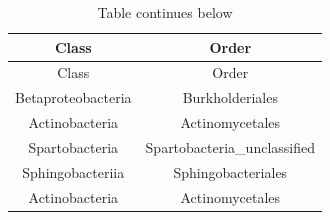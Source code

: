 \documentclass[]{article}
\begin{document}
\begin{longtable}[]{@{}cc@{}}
\caption{Table continues below}\tabularnewline
\toprule
\begin{minipage}[b]{0.39\columnwidth}\centering\strut
Class\strut
\end{minipage} & \begin{minipage}[b]{0.43\columnwidth}\centering\strut
Order\strut
\end{minipage}\tabularnewline
\midrule
\endfirsthead
\toprule
\begin{minipage}[b]{0.39\columnwidth}\centering\strut
Class\strut
\end{minipage} & \begin{minipage}[b]{0.43\columnwidth}\centering\strut
Order\strut
\end{minipage}\tabularnewline
\midrule
\endhead
\begin{minipage}[t]{0.39\columnwidth}\centering\strut
Betaproteobacteria\strut
\end{minipage} & \begin{minipage}[t]{0.43\columnwidth}\centering\strut
Burkholderiales\strut
\end{minipage}\tabularnewline
\begin{minipage}[t]{0.39\columnwidth}\centering\strut
Actinobacteria\strut
\end{minipage} & \begin{minipage}[t]{0.43\columnwidth}\centering\strut
Actinomycetales\strut
\end{minipage}\tabularnewline
\begin{minipage}[t]{0.39\columnwidth}\centering\strut
Spartobacteria\strut
\end{minipage} & \begin{minipage}[t]{0.43\columnwidth}\centering\strut
Spartobacteria\_unclassified\strut
\end{minipage}\tabularnewline
\begin{minipage}[t]{0.39\columnwidth}\centering\strut
Sphingobacteriia\strut
\end{minipage} & \begin{minipage}[t]{0.43\columnwidth}\centering\strut
Sphingobacteriales\strut
\end{minipage}\tabularnewline
\begin{minipage}[t]{0.39\columnwidth}\centering\strut
Actinobacteria\strut
\end{minipage} & \begin{minipage}[t]{0.43\columnwidth}\centering\strut
Actinomycetales\strut
\end{minipage}\tabularnewline

\end{longtable}
\end{document}
